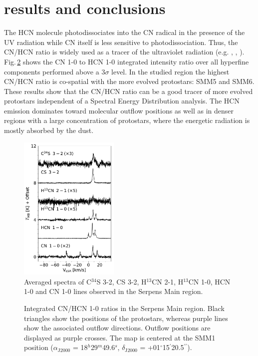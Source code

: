 \documentclass[a4paper]{article}
\begin{document}
\section*{\sc results and conclusions}
\indent \indent The HCN molecule photodissociates into the CN radical in the presence of the UV radiation while CN itself is less sensitive to photodissociation. Thus, the CN/HCN ratio is widely used as a tracer of the ultraviolet radiation (e.g. \cite{fuente1995}, \cite{chapillon2012}, \cite{riaz2018}). Fig.\,\ref{fig2} shows the CN 1-0 to HCN 1-0 integrated intensity ratio over all hyperfine components performed above a $3\sigma$ level. In the studied region the highest CN/HCN ratio is co-spatial with the more evolved protostars: SMM5 and SMM6. These results show that the CN/HCN ratio can be a good tracer of more evolved protostars independent of a Spectral Energy Distribution analysis. The HCN emission dominates toward molecular outflow positions as well as in denser regions with a large concentration of protostars, where the energetic radiation is mostly absorbed by the dust.

\begin{figure}[!h]
\centering
\includegraphics[height=7cm]{serpens_spectra.pdf}
\caption{Averaged spectra of C$^{34}$S 3-2, CS 3-2, H$^{13}$CN 2-1, H$^{13}$CN 1-0, HCN 1-0 and CN 1-0 lines observed in the Serpens Main region.}
\label{fig1}
\end{figure}

\begin{figure}[!h]
\centering
{}
\caption{Integrated CN/HCN 1-0 ratios in the Serpens Main region. Black triangles show the positions of the protostars, whereas purple lines show the associated outflow directions. Outflow positions are displayed as purple crosses. The map is centered at the SMM1 position ($\alpha_\mathrm{J2000}$ = 18$^h$29$^m$49.6$^s$, $\delta_\mathrm{J2000}$ = +01$^{\circ}$15$^{\prime}$20.5$^{\prime\prime}$).}
\label{fig2}
\end{figure}
\end{document}
